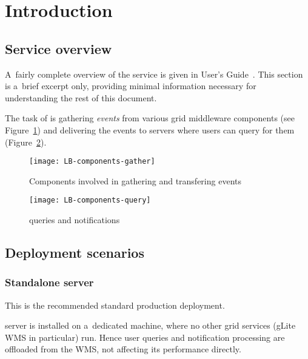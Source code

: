 \section{Introduction}

\subsection{Service overview}

A~fairly complete overview of the \LB service is given in \LB User's Guide~\cite{lbug}.
This section is a~brief excerpt only, providing minimal information necessary for
understanding the rest of this document.

The task of \LB is gathering \emph{\LB events} from various grid middleware components
(see Figure~\ref{f:comp-gather})
and delivering the events to \LB servers where users can query for them
(Figure~\ref{f:comp-query}).

\begin{figure}[ht]
\centering
\texttt{[image: LB-components-gather]}
\caption{Components involved in gathering and transfering \LB events}
\label{f:comp-gather}
\end{figure}

\begin{figure}[ht]
\centering
\texttt{[image: LB-components-query]}
\caption{\LB queries and notifications}
\label{f:comp-query}
\end{figure}




\subsection{Deployment scenarios}



\subsubsection{Standalone \LB server}

This is the recommended standard production deployment.

\LB server is installed on a~dedicated machine,
where no other grid services (gLite WMS in particular) run.
Hence user queries and notification processing are offloaded 
from the WMS, not affecting its performance directly.

